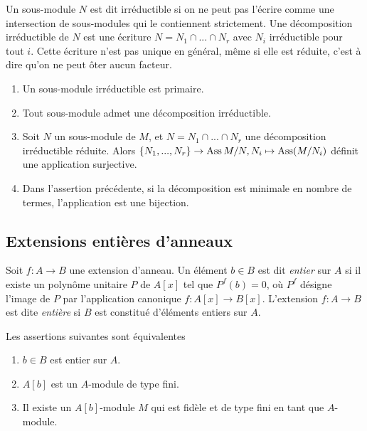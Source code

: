 Un sous-module $N$ est dit irréductible si on ne peut pas l'écrire comme une intersection de sous-modules qui le contiennent strictement. Une décomposition irréductible de $N$ est une écriture $N=N_1\cap...\cap N_r$ avec $N_i$ irréductible pour tout $i$. Cette écriture n'est pas unique en général, même si elle est réduite, c'est à dire qu'on ne peut ôter aucun facteur. 

\begin{thm}
\begin{enumerate}
\item Un sous-module irréductible est primaire.
\item Tout sous-module admet une décomposition irréductible.
\item Soit $N$ un sous-module de $M$, et $N=N_1\cap...\cap N_r$ une décomposition irréductible réduite. Alors $\lbrace N_1,...,N_r\rbrace\rightarrow \operatorname{Ass} M/N, N_i\mapsto \operatorname{Ass}(M/N_i)$ définit une application surjective.
\item Dans l'assertion précédente, si la décomposition est minimale en nombre de termes, l'application est une bijection.
\end{enumerate}
\end{thm}

\subsection{Extensions entières d'anneaux}

Soit $f:A\rightarrow B$ une extension d'anneau. Un élément $b\in B$ est dit \textit{entier} sur $A$ si il existe un polynôme unitaire $P$ de $A[x]$ tel que $P^f(b)=0$, où $P^f$ désigne l'image de $P$ par l'application canonique $f:A[x]\rightarrow B[x]$. L'extension $f:A\rightarrow B$ est dite \textit{entière} si $B$ est constitué d'éléments entiers sur $A$.

\begin{prop}
Les assertions suivantes sont équivalentes
\begin{enumerate}
\item $b\in B$ est entier sur $A$.
\item $A[b]$ est un $A$-module de type fini.
\item Il existe un $A[b]$-module $M$ qui est fidèle et de type fini en tant que $A$-module.
\end{enumerate}
\end{prop}

